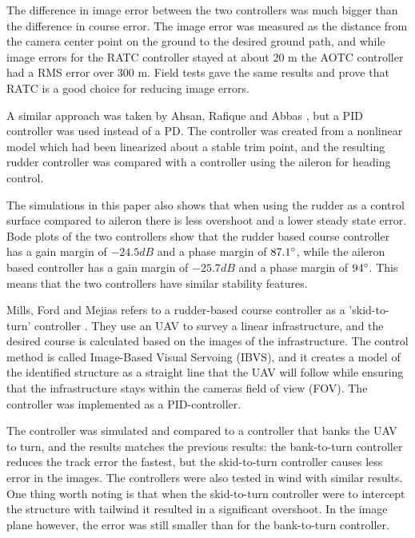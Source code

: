 The difference in image error between the two controllers was much bigger than the difference in course error. The image error was measured as the distance from the camera center point on the ground to the desired ground path, and while image errors for the RATC controller stayed at about $20$ m the AOTC controller had a RMS error over $300$ m. Field tests gave the same results and prove that RATC is a good choice for reducing image errors.


A similar approach was taken by Ahsan, Rafique and Abbas \cite{alternateSurfaceAhsan}, but a PID controller was used instead of a PD. The controller was created from a nonlinear model which had been linearized about a stable trim point, and the resulting rudder controller was compared with a controller using the aileron for heading control.

The simulations in this paper also shows that when using the rudder as a control surface compared to aileron there is less overshoot and a lower steady state error. Bode plots of the two controllers show that the rudder based course controller has a gain margin of $-24.5 dB$ and a phase margin of $87.1 \degree$, while the aileron based controller has a gain margin of $-25.7 dB$ and a phase margin of $94 \degree$. This means that the two controllers have similar stability features.

Mills, Ford and Mejias refers to a rudder-based course controller as a 'skid-to-turn' controller \cite{skidToTurnMills}. They use an UAV to survey a linear infrastructure, and the desired course is calculated based on the images of the infrastructure. The control method is called Image-Based Visual Servoing (IBVS), and it creates a model of the identified structure as a straight line that the UAV will follow while ensuring that the infrastructure stays within the cameras field of view (FOV). The controller was implemented as a PID-controller.

The controller was simulated and compared to a controller that banks the UAV to turn, and the results matches the previous results: the bank-to-turn controller reduces the track error the fastest, but the skid-to-turn controller causes less error in the images. The controllers were also tested in wind with similar results. One thing worth noting is that when the skid-to-turn controller were to intercept the structure with tailwind it resulted in a significant overshoot. In the image plane however, the error was still smaller than for the bank-to-turn controller.


